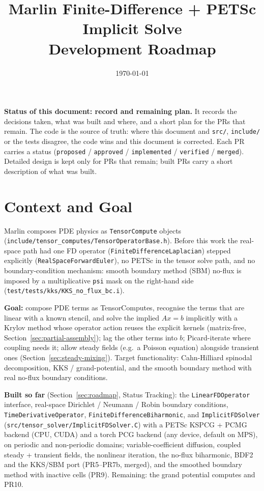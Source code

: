 \documentclass[11pt]{article}
\title{\textcolor{marlinblue}{\Huge Marlin Finite-Difference + PETSc\\[2pt] Implicit Solve}\\[8pt]
\Large Development Roadmap}
\author{}
\date{\today}
\begin{document}
\maketitle

\begin{tcolorbox}[colback=lightgray, colframe=marlinblue, boxrule=0.6pt, arc=1mm]
\textbf{Status of this document: record and remaining plan.} It records the
decisions taken, what was built and where, and a short plan for the PRs that
remain. The code is the source of truth: where this document and
\texttt{src/}, \texttt{include/} or the tests disagree, the code wins and this
document is corrected. Each PR carries a status (\texttt{proposed} /
\texttt{approved} / \texttt{implemented} / \texttt{verified} / \texttt{merged}).
Detailed design is kept only for PRs that remain; built PRs carry a short
description of what was built.
\end{tcolorbox}

\tableofcontents
\vspace{1em}

\section{Context and Goal}

Marlin composes PDE physics as \texttt{TensorCompute} objects
(\texttt{include/tensor\_computes/TensorOperatorBase.h}). Before this work the
real-space path had one FD operator (\texttt{FiniteDifferenceLaplacian})
stepped explicitly (\texttt{RealSpaceForwardEuler}), no PETSc in the tensor
solve path, and no boundary-condition mechanism: smooth boundary method (SBM)
no-flux is imposed by a multiplicative \texttt{psi} mask on the right-hand
side (\texttt{test/tests/kks/KKS\_no\_flux\_bc.i}).

\textbf{Goal:} compose PDE terms as TensorComputes, recognise the terms that
are linear with a known stencil, and solve the implied $Ax=b$ implicitly with
a Krylov method whose operator action reuses the explicit kernels
(matrix-free, Section~\ref{sec:partial-assembly}); lag the other terms into
$b$; Picard-iterate where coupling needs it; allow steady fields (e.g.\ a
Poisson equation) alongside transient ones (Section~\ref{sec:steady-mixing}).
Target functionality: Cahn-Hilliard spinodal decomposition, KKS /
grand-potential, and the smooth boundary method with real no-flux boundary
conditions.

\textbf{Built so far} (Section~\ref{sec:roadmap}, Status Tracking): the
\texttt{LinearFDOperator} interface, real-space Dirichlet / Neumann / Robin
boundary conditions, \texttt{TimeDerivativeOperator},
\texttt{FiniteDifferenceBiharmonic}, and \texttt{ImplicitFDSolver}
(\texttt{src/tensor\_solver/ImplicitFDSolver.C}) with a PETSc KSPCG + PCMG
backend (CPU, CUDA) and a torch PCG backend (any device, default on MPS), on
periodic and non-periodic domains; variable-coefficient diffusion, coupled
steady + transient fields, the nonlinear iteration, the no-flux biharmonic, BDF2
and the KKS/SBM port (PR5--PR7b, merged), and the smoothed boundary method with
inactive cells (PR9). Remaining: the grand potential computes and PR10.
\end{document}
